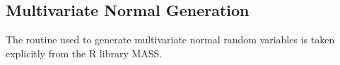 \documentclass[oneside,letterpaper,titlepage]{article}
\begin{document}
\subsection*{Multivariate Normal Generation}

The routine used to generate multivariate normal random variables is
taken explicitly from the R library MASS.

 \bibsep=0in

\end{document}
